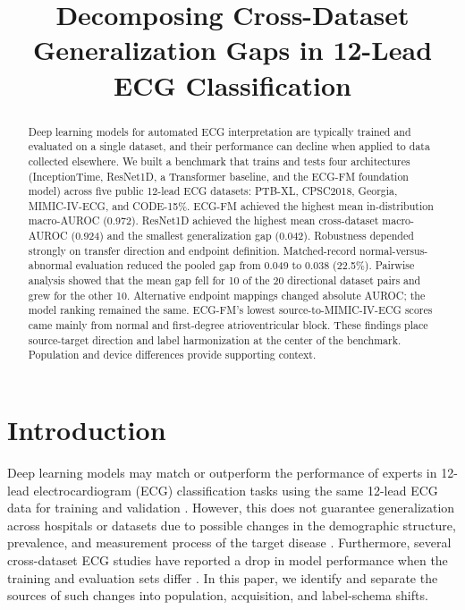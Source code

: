 \documentclass[conference]{IEEEtran}
\title{Decomposing Cross-Dataset Generalization Gaps in 12-Lead ECG Classification}
\author{}
\begin{document}
\maketitle

\begin{abstract}
Deep learning models for automated ECG interpretation are typically trained and evaluated on a single dataset, and their performance can decline when applied to data collected elsewhere. We built a benchmark that trains and tests four architectures (InceptionTime, ResNet1D, a Transformer baseline, and the ECG-FM foundation model) across five public 12-lead ECG datasets: PTB-XL, CPSC2018, Georgia, MIMIC-IV-ECG, and CODE-15\%. ECG-FM achieved the highest mean in-distribution macro-AUROC (0.972). ResNet1D achieved the highest mean cross-dataset macro-AUROC (0.924) and the smallest generalization gap (0.042). Robustness depended strongly on transfer direction and endpoint definition. Matched-record normal-versus-abnormal evaluation reduced the pooled gap from 0.049 to 0.038 (22.5\%). Pairwise analysis showed that the mean gap fell for 10 of the 20 directional dataset pairs and grew for the other 10. Alternative endpoint mappings changed absolute AUROC; the model ranking remained the same. ECG-FM's lowest source-to-MIMIC-IV-ECG scores came mainly from normal and first-degree atrioventricular block. These findings place source-target direction and label harmonization at the center of the benchmark. Population and device differences provide supporting context.
\end{abstract}

\section{Introduction}

Deep learning models may match or outperform the performance of experts in 12-lead electrocardiogram (ECG) classification tasks using the same 12-lead ECG data for training and validation \cite{ribeiro2020}. However, this does not guarantee generalization across hospitals or datasets due to possible changes in the demographic structure, prevalence, and measurement process of the target disease \cite{subbaswamy2020}. Furthermore, several cross-dataset ECG studies have reported a drop in model performance when the training and evaluation sets differ \cite{wantlin2023}. In this paper, we identify and separate the sources of such changes into population, acquisition, and label-schema shifts.
\end{document}
